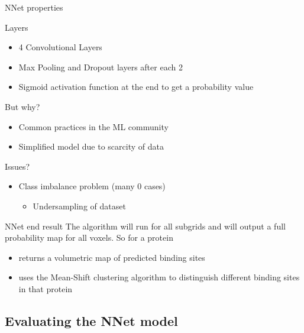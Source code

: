 \documentclass{beamer}
\begin{document}
\begin{frame}{NNet properties}
  \begin{block}{Layers}
    \begin{itemize}
      \item 4 Convolutional Layers
      \item Max Pooling and Dropout layers after each 2
      \item Sigmoid activation function at the end to get a probability value
    \end{itemize}
  \end{block}
  \begin{block}{But why?}
    \begin{itemize}
      \item Common practices in the ML community
      \item Simplified model due to scarcity of data
    \end{itemize}
  \end{block}
  \begin{block}{Issues?}
    \begin{itemize}
      \item Class imbalance problem (many 0 cases)
      \begin{itemize}
        \item Undersampling of dataset
      \end{itemize}
    \end{itemize}
  \end{block}
\end{frame}

\begin{frame}{NNet end result}
  The algorithm will run for all subgrids and will output a full probability map for all voxels.
  So for a protein
  \begin{itemize}
    \item returns a volumetric map of predicted binding sites
    \item uses the Mean-Shift clustering algorithm to distinguish different binding sites in that protein
  \end{itemize}
\end{frame}

\subsection{Evaluating the NNet model}
\end{document}
